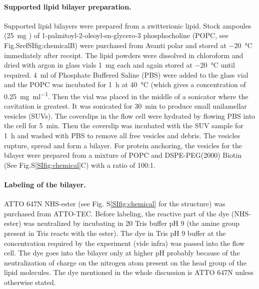 \paragraph*{Supported lipid bilayer preparation.}
Supported lipid bilayers were prepared from a zwitterionic lipid.
Stock ampoules (\SI{25}{\mg} ) of 1-palmitoyl-2-oleoyl-sn-glycero-3 phosphocholine (POPC, see Fig.Sref{SIfig:chemical}B) were purchased from Avanti polar and stored at \SI{-20}{\celsius} immediately after receipt.
The lipid powders were dissolved in chloroform and dried with argon in glass vials \SI{1}{\mg} each and again stored at \SI{-20}{\celsius} until required.
\SI{4}{\ml} of Phosphate Buffered Saline (PBS) were added to the glass vial and the POPC was incubated for \SI{1}{\hour} at \SI{40}{\celsius} (which gives a concentration of \SI{0.25}{\mg\per\ml}.
Then the vial was placed in the middle of a sonicator where the cavitation is greatest.
It was sonicated for \SI{30}{\minute} to produce small unilamellar vesicles (SUVs). 
The coverslips in the flow cell were hydrated by flowing PBS into the cell for \SI{5}{\minute}.
Then the coverslip was incubated with the SUV sample for \SI{1}{\hour} and washed with PBS to remove all free vesicles and debris.
The vesicles rupture, spread and form a bilayer.\cite{richter2006formation}
For protein anchoring, the vesicles for the bilayer were prepared from a mixture of POPC and DSPE-PEG(2000) Biotin (See Fig.S\ref{SIfig:chemical}C) with a ratio of 100:1.

\paragraph*{Labeling of the bilayer.}
ATTO 647N NHS-ester (see Fig. S\ref{SIfig:chemical} for the structure) was purchased from ATTO-TEC.
Before labeling, the reactive part of the dye (NHS-ester) was neutralized by incubating in \SI{20}{\mM} Tris buffer pH 9 (the amine group present in Tris reacts with the ester).
The dye in Tris pH 9 buffer at the concentration required by the experiment (vide infra) was passed into the flow cell.
The dye goes into the bilayer only at higher pH probably because of the neutralization of charge on the nitrogen atom present on the head group of the lipid molecules. 
The dye mentioned in the whole discussion is ATTO 647N unless otherwise stated.

